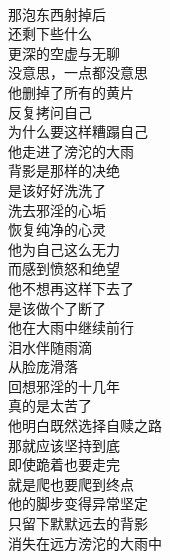 \begin{poem}[雨中的背影]
    \begin{multicols}{2}
        \begin{center}~\\
            那泡东西射掉后 \\ 还剩下些什么 \\ 更深的空虚与无聊 \\ 没意思，一点都没意思 \\ 他删掉了所有的黄片 \\ 反复拷问自己 \\ 为什么要这样糟蹋自己 \\ 他走进了滂沱的大雨 \\ 背影是那样的决绝 \\ 是该好好洗洗了 \\ 洗去邪淫的心垢 \\ 恢复纯净的心灵 \\ 他为自己这么无力 \\ 而感到愤怒和绝望 \\ 他不想再这样下去了 \\ 是该做个了断了 \\ 他在大雨中继续前行 \\ 泪水伴随雨滴 \\ 从脸庞滑落 \\ 回想邪淫的十几年 \\ 真的是太苦了 \\ 他明白既然选择自赎之路 \\ 那就应该坚持到底 \\ 即使跪着也要走完 \\ 就是爬也要爬到终点 \\ 他的脚步变得异常坚定 \\ 只留下默默远去的背影 \\ 消失在远方滂沱的大雨中
        \end{center}
    \end{multicols}
\end{poem}

